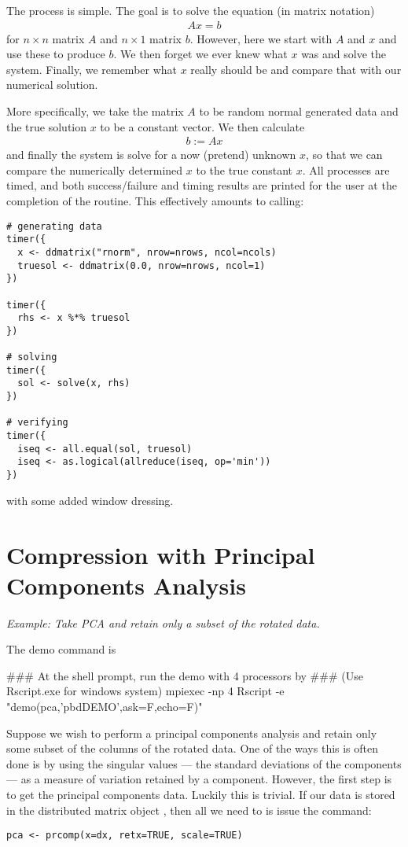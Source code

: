 The process is simple.  The goal is to solve the equation (in matrix notation)
\begin{align*}
Ax=b
\end{align*}
for $n\times n$ matrix $A$ and $n\times 1$ matrix $b$.  However, here we start with $A$ and $x$ and use these to produce $b$.  We then forget we ever knew what $x$ was and solve the system.  Finally, we remember what $x$ really should be and compare that with our numerical solution.
  
More specifically, we take the matrix $A$ to be random normal generated data and the true solution $x$ to be a constant vector.  We then calculate
\begin{align*}
b := Ax
\end{align*}
and finally the system is solve for a now (pretend) unknown $x$, so that we can compare the numerically determined $x$ to the true constant $x$.  All processes are timed, and both success/failure and timing results are printed for the user at the completion of the routine.  This effectively amounts to calling:
\begin{lstlisting}[language=rr,title=Verifying Distributed System Solving]
# generating data
timer({
  x <- ddmatrix("rnorm", nrow=nrows, ncol=ncols)
  truesol <- ddmatrix(0.0, nrow=nrows, ncol=1)
})

timer({
  rhs <- x %*% truesol
})

# solving
timer({
  sol <- solve(x, rhs)
})

# verifying
timer({
  iseq <- all.equal(sol, truesol)
  iseq <- as.logical(allreduce(iseq, op='min'))
})
\end{lstlisting}
with some added window dressing.







\section{Compression with Principal Components Analysis}

\emph{Example:  Take PCA and retain only a subset of the rotated data.}

The demo command is
\begin{Command}
### At the shell prompt, run the demo with 4 processors by
### (Use Rscript.exe for windows system)
mpiexec -np 4 Rscript -e "demo(pca,'pbdDEMO',ask=F,echo=F)"
\end{Command}

Suppose we wish to perform a principal components analysis and retain only some subset of the columns of the rotated data.  One of the ways this is often done is by using the singular values --- the standard deviations of the components --- as a measure of variation retained by a component.  However, the first step is to get the principal components data.  Luckily this is trivial.  If our data is stored in the distributed matrix object , then all we need to is issue the command:
\begin{lstlisting}[language=rr]
pca <- prcomp(x=dx, retx=TRUE, scale=TRUE)
\end{lstlisting}

